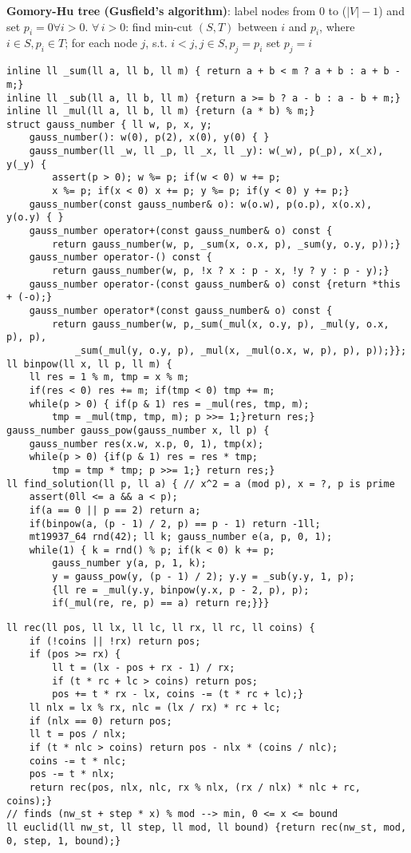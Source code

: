 \documentclass[12pt]{article}
\begin{document}
{\bf Gomory-Hu tree (Gusfield’s algorithm)}: label nodes from $0$ to ($|V| - 1$) and 
set $p_i=0 \forall i > 0$. $\forall\,i > 0$: find min-cut $(S, T)$ 
between $i$ and $p_i$, where $i \in S, p_i \in T$; 
for each node $j$, s.t. $i < j, j \in S, p_j=p_i$ set $p_j = i$

\begin{verbatim}
inline ll _sum(ll a, ll b, ll m) { return a + b < m ? a + b : a + b - m;}
inline ll _sub(ll a, ll b, ll m) {return a >= b ? a - b : a - b + m;}
inline ll _mul(ll a, ll b, ll m) {return (a * b) % m;}
struct gauss_number { ll w, p, x, y;
    gauss_number(): w(0), p(2), x(0), y(0) { }
    gauss_number(ll _w, ll _p, ll _x, ll _y): w(_w), p(_p), x(_x), y(_y) {
        assert(p > 0); w %= p; if(w < 0) w += p; 
        x %= p; if(x < 0) x += p; y %= p; if(y < 0) y += p;}
    gauss_number(const gauss_number& o): w(o.w), p(o.p), x(o.x), y(o.y) { }
    gauss_number operator+(const gauss_number& o) const {
        return gauss_number(w, p, _sum(x, o.x, p), _sum(y, o.y, p));}
    gauss_number operator-() const {
        return gauss_number(w, p, !x ? x : p - x, !y ? y : p - y);}
    gauss_number operator-(const gauss_number& o) const {return *this + (-o);}
    gauss_number operator*(const gauss_number& o) const {
        return gauss_number(w, p,_sum(_mul(x, o.y, p), _mul(y, o.x, p), p),
            _sum(_mul(y, o.y, p), _mul(x, _mul(o.x, w, p), p), p));}};
ll binpow(ll x, ll p, ll m) {
    ll res = 1 % m, tmp = x % m;
    if(res < 0) res += m; if(tmp < 0) tmp += m;
    while(p > 0) { if(p & 1) res = _mul(res, tmp, m);
        tmp = _mul(tmp, tmp, m); p >>= 1;}return res;}
gauss_number gauss_pow(gauss_number x, ll p) {
    gauss_number res(x.w, x.p, 0, 1), tmp(x);
    while(p > 0) {if(p & 1) res = res * tmp;
        tmp = tmp * tmp; p >>= 1;} return res;}
ll find_solution(ll p, ll a) { // x^2 = a (mod p), x = ?, p is prime
    assert(0ll <= a && a < p);
    if(a == 0 || p == 2) return a;
    if(binpow(a, (p - 1) / 2, p) == p - 1) return -1ll;
    mt19937_64 rnd(42); ll k; gauss_number e(a, p, 0, 1);
    while(1) { k = rnd() % p; if(k < 0) k += p;
        gauss_number y(a, p, 1, k);
        y = gauss_pow(y, (p - 1) / 2); y.y = _sub(y.y, 1, p);
        {ll re = _mul(y.y, binpow(y.x, p - 2, p), p);
        if(_mul(re, re, p) == a) return re;}}}
\end{verbatim}

\begin{verbatim}
ll rec(ll pos, ll lx, ll lc, ll rx, ll rc, ll coins) {
    if (!coins || !rx) return pos;
    if (pos >= rx) {
        ll t = (lx - pos + rx - 1) / rx;
        if (t * rc + lc > coins) return pos;
        pos += t * rx - lx, coins -= (t * rc + lc);}
    ll nlx = lx % rx, nlc = (lx / rx) * rc + lc;
    if (nlx == 0) return pos;
    ll t = pos / nlx;
    if (t * nlc > coins) return pos - nlx * (coins / nlc);
    coins -= t * nlc;
    pos -= t * nlx;
    return rec(pos, nlx, nlc, rx % nlx, (rx / nlx) * nlc + rc, coins);}
// finds (nw_st + step * x) % mod --> min, 0 <= x <= bound
ll euclid(ll nw_st, ll step, ll mod, ll bound) {return rec(nw_st, mod, 0, step, 1, bound);}
\end{verbatim}
\end{document}
